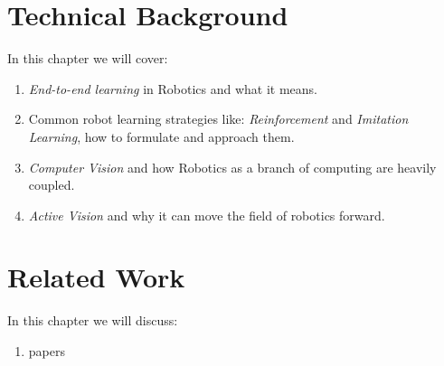 \chapter{Technical Background}
  In this chapter we will cover:
  \begin{enumerate}
    \item \emph{End-to-end learning} in Robotics and what it means.
    \item Common robot learning strategies like: \emph{Reinforcement} and \emph{Imitation Learning}, how to formulate and approach them.
    \item \emph{Computer Vision} and how Robotics as a branch of computing are heavily coupled.
    \item \emph{Active Vision} and why it can move the field of robotics forward.
  \end{enumerate}

\chapter{Related Work}
  In this chapter we will discuss:
  \begin{enumerate}
    \item papers
  \end{enumerate}

